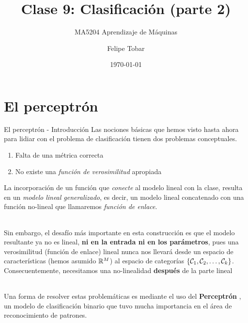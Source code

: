 \documentclass[handout, 9pt]{beamer}
\title{Clase 9: Clasificación (parte 2)}
\subtitle{MA5204 Aprendizaje de Máquinas}
\date{\today}
\author{Felipe Tobar}
\institute{Department of Mathematical Engineering \&\\ Center for Mathematical Modelling\\Universidad de Chile}
\begin{document}
\begin{frame}
  \titlepage
\end{frame}

\section{El perceptrón}

\begin{frame}{El perceptrón - Introducción}
Las nociones básicas que hemos visto hasta ahora para lidiar con el problema de clasificación tienen dos problemas conceptuales. \pause
\begin{enumerate}
  \item Falta de una métrica correcta \pause
  \item No existe una \emph{función de verosimilitud} apropiada \pause
\end{enumerate}

La incorporación de un función que \emph{conecte} al modelo lineal con la clase, resulta en un \emph{modelo lineal generalizado}, es decir, un modelo lineal concatenado con una función no-lineal que llamaremos \emph{función de enlace}.\\~\ \pause

Sin embargo, el desafío más importante en esta construcción es que el modelo resultante ya no es lineal, \textbf{ni en la entrada ni en los parámetros}, pues una verosimilitud (función de enlace) lineal nunca nos llevará desde un espacio de características  (hemos asumido $\mathbb{R}^M$) al espacio de categorías $\{{\mathcal C}_1,{\mathcal C}_2,\ldots,{\mathcal C}_k\}$. Consecuentemente, necesitamos una no-linealidad \textbf{después} de la parte lineal \\~\

Una forma de resolver estas problemáticas es mediante el uso del \textbf{Perceptrón} \cite{rosenblatt_1958}, un modelo de clasificación binario que tuvo mucha importancia en el área de reconocimiento de patrones.

\end{frame}
\end{document}
